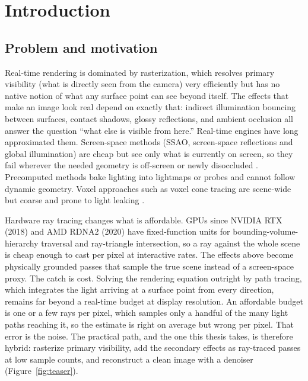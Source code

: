 \chapter{Introduction}
\label{ch:uvod}

\section{Problem and motivation}

Real-time rendering is dominated by rasterization, which resolves primary visibility (what is
directly seen from the camera) very efficiently but has no native notion of what any surface point
can see beyond itself. The effects that make an image look real depend on exactly that: indirect
illumination bouncing between surfaces, contact shadows, glossy reflections, and ambient occlusion
all answer the question ``what else is visible from here.'' Real-time engines have long approximated
them. Screen-space methods (SSAO, screen-space reflections and global illumination) are cheap but see only
what is currently on screen, so they fail wherever the needed geometry is off-screen or newly
disoccluded \cite{mittring2007cryengine, bavoil2008hbao}. Precomputed methods bake lighting into
lightmaps or probes and cannot follow dynamic geometry. Voxel approaches such as voxel cone tracing
are scene-wide but coarse and prone to light leaking \cite{crassin2011vxgi}.

Hardware ray tracing changes what is affordable. GPUs since NVIDIA RTX (2018) and AMD RDNA2 (2020)
have fixed-function units for bounding-volume-hierarchy traversal and ray-triangle intersection, so
a ray against the whole scene is cheap enough to cast per pixel at interactive rates. The effects
above become physically grounded passes that sample the true scene instead of a screen-space proxy.
The catch is cost. Solving the rendering
equation \cite{kajiya1986rendering} outright by path tracing, which integrates the light arriving at a surface point from every
direction, remains far beyond a real-time budget at display resolution. An affordable budget is one
or a few rays per pixel, which samples only a handful of the many light paths reaching it, so the
estimate is right on average but wrong per pixel. That error is the noise. The practical path, and
the one this thesis takes, is therefore hybrid: rasterize primary visibility, add the secondary effects as ray-traced passes at low sample
counts, and reconstruct a clean image with a denoiser \cite{schied2017svgf}
(Figure~\ref{fig:teaser}).

